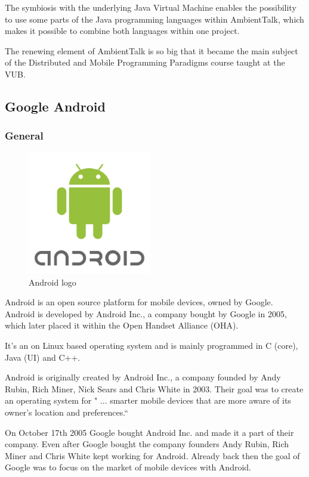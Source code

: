 \documentclass[a4paper,12pt]{report}
\begin{document}
The symbiosis with the underlying Java Virtual Machine enables the possibility to use some parts of the Java programming languages within AmbientTalk, which makes it possible to combine both languages within
one project.

The renewing element of AmbientTalk is so big that it became the main subject of the Distributed and Mobile Programming Paradigms course taught at the VUB.
\subsection{Google Android}



\subsubsection{General}
\begin{figure}
  \begin{center}
    \includegraphics[width=0.48\textwidth]{images/android.png}
  \end{center}
  \caption{Android logo}
\end{figure}
Android is an open source platform for mobile devices, owned by Google. Android is developed by Android Inc., a company bought by Google in 2005, which later placed it 
within the Open Handset Alliance (OHA). 

It's an on Linux based operating system and is mainly programmed in C (core), Java (UI) and C++.

Android is originally created by Android Inc., a company founded by Andy Rubin, Rich Miner, Nick Sears and Chris White in 2003. Their goal was to create an operating system
for " ... smarter mobile devices that are more aware of its owner's location and preferences.`` 

On October 17th 2005 Google bought Android Inc. and made it a part of their company. Even after Google bought the company founders Andy Rubin, Rich Miner and Chris White
kept working for Android. Already back then the goal of Google was to focus on the market of mobile devices with Android.
\end{document}
